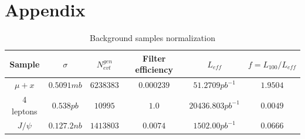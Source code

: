 \documentclass[aps,12pt,superscriptaddress,nofootinbib,floatfix,showpacs]{revtex4}
\begin{document}
\section{Appendix}


\begin{table}[t]
\caption{Background samples normalization\label{bckgr_normalize}}
\begin{center}
\begin{tabular}{|c|c|c|c|c|c|}
\hline
Sample & $\sigma$ & $N^{gen}_{evt}$ & Filter efficiency & $L_{eff}$ & $f = L_{100}/L_{eff}$ \\ \hline
$\mu+x$ &           $0.5091mb$    &    $6238383$      &    $0.000239$  &  $51.2709pb^{-1}$   &  $1.9504$ \\ \hline
4 leptons &        $0.538pb$     &    $10995$        &    $1.0$       &  $20436.803pb^{-1}$ &  $0.0049$ \\ \hline
$J/\psi$ &         $0.127.2nb$   &    $1413803$      &    $0.0074$    &  $1502.00pb^{-1}$   &  $0.0666$ \\ \hline

\end{tabular}
\end{center}
\end{table}
\end{document}
